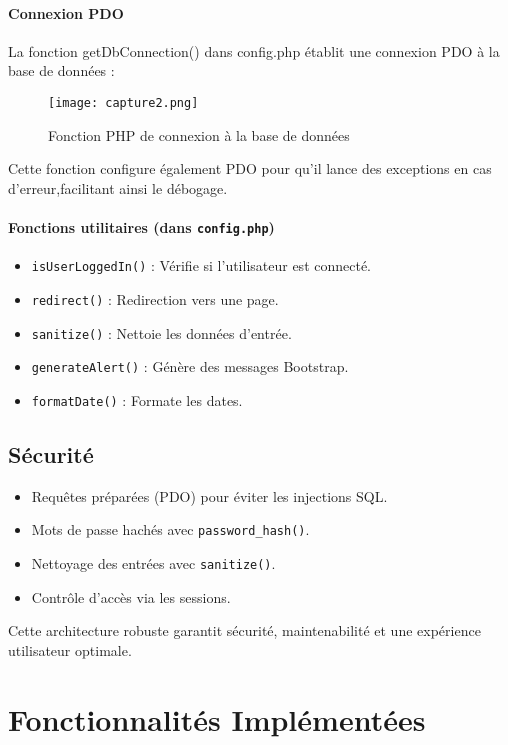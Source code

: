 \documentclass[a4paper,12pt]{article}
\begin{document}
\paragraph{Connexion PDO}
La fonction getDbConnection() dans config.php établit une connexion PDO à la base de données :
\begin{figure}[H]
  \centering
  \texttt{[image: capture2.png]}
  \caption{Fonction PHP de connexion à la base de données}
\end{figure}
Cette fonction configure également PDO pour qu'il lance des exceptions en cas d'erreur,facilitant ainsi le débogage.

\paragraph{Fonctions utilitaires (dans \texttt{config.php})}
\begin{itemize}
    \item \texttt{isUserLoggedIn()} : Vérifie si l’utilisateur est connecté.
    \item \texttt{redirect()} : Redirection vers une page.
    \item \texttt{sanitize()} : Nettoie les données d’entrée.
    \item \texttt{generateAlert()} : Génère des messages Bootstrap.
    \item \texttt{formatDate()} : Formate les dates.
\end{itemize}

\subsection{Sécurité}
\begin{itemize}
    \item Requêtes préparées (PDO) pour éviter les injections SQL.
    \item Mots de passe hachés avec \texttt{password\_hash()}.
    \item Nettoyage des entrées avec \texttt{sanitize()}.
    \item Contrôle d'accès via les sessions.
\end{itemize}

Cette architecture robuste garantit sécurité, maintenabilité et une expérience utilisateur optimale.

\section{Fonctionnalités Implémentées}
\end{document}
